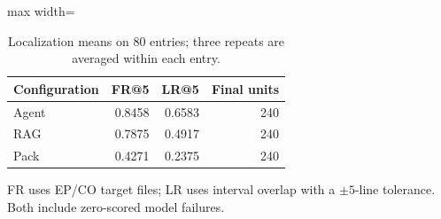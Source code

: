 \begin{table}[t]
\centering
\caption{Localization means on 80 entries; three repeats are averaged within each entry.}\label{tab:main}
\small
\begin{adjustbox}{max width=\columnwidth}\begin{tabular}{lrrr}
\toprule
Configuration & FR@5 & LR@5 & Final units \\
\midrule
Agent & 0.8458 & 0.6583 & 240 \\
RAG & 0.7875 & 0.4917 & 240 \\
Pack & 0.4271 & 0.2375 & 240 \\
\bottomrule
\end{tabular}\end{adjustbox}
\par\vspace{2pt}\begin{minipage}{\columnwidth}\footnotesize FR uses EP/CO target files; LR uses interval overlap with a $\pm5$-line tolerance. Both include zero-scored model failures.\end{minipage}
\end{table}
